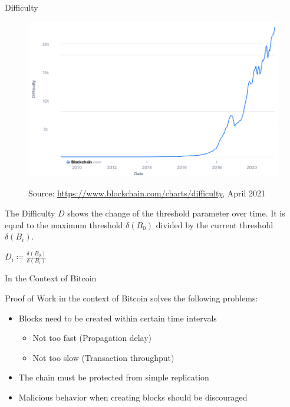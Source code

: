 \documentclass[handout]{beamer}
\begin{document}
\begin{frame}{Difficulty}
	\begin{figure}[t]
		\includegraphics[height=\textheight/2]{../assets/images/difficulty}
		
		\tiny Source: \link \url{https://www.blockchain.com/charts/difficulty}, April 2021
	\end{figure}
	
	
	
	The Difficulty $D$ shows the change of the threshold parameter over time. It is equal to the maximum threshold $\delta(B_0)$ divided by the current threshold $\delta(B_i)$.
	\begin{center}
		$D_i \coloneqq \frac{\delta(B_0)}{\delta(B_i)}$
	\end{center}
\end{frame}

\begin{frame}{In the Context of Bitcoin}

Proof of Work in the context of Bitcoin solves the following problems:

\begin{itemize}
	\item Blocks need to be created within certain time intervals
	\begin{itemize}
		\item Not too fast (Propagation delay)
		\item Not too slow (Transaction throughput)
	\end{itemize}
	\item The chain must be protected from simple replication
	\item Malicious behavior when creating blocks should be discouraged 
\end{itemize}

\end{frame}
\end{document}
